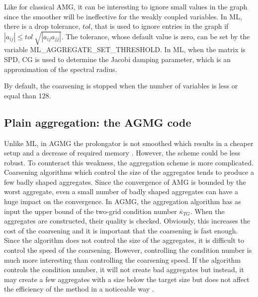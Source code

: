 Like for classical AMG, it can be interesting to ignore small values in
the graph since the smoother will be ineffective for the weakly coupled
variables. In ML, there is a drop tolerance, $tol$, that is used to ignore
entries in the graph if $|a_{ij}| \leq tol\ \sqrt{|a_{ij} a_{jj}|}$. The
tolerance, whose default value is zero, can be set by the variable 
ML\_AGGREGATE\_SET\_THRESHOLD.  In ML, when the matrix is SPD, CG is used 
to determine the Jacobi damping parameter, which is an approximation of 
the spectral radius.

By default, the coarsening is stopped when the number of variables is less 
or equal than 128.

\subsection{Plain aggregation: the AGMG code}
Unlike ML, in AGMG the prolongator is not smoothed which results in a
cheaper setup and a decrease of required memory \cite{agmg2}. However, 
the scheme could be less robust. To counteract this weakness, 
the aggregation scheme is more complicated. Coarsening algorithms which control
the size of the aggregates tends to produce a few badly shaped aggregates.
Since the convergence of AMG is bounded by the worst aggregate, even a small 
number of badly shaped aggregates can have a huge impact on the convergence. 
In AGMG, the aggregation algorithm has as input the upper bound of the 
two-grid condition number $\bar{\kappa}_{TG}$. When the aggregates are constructed,
their quality is checked. Obviously, this increases the cost of the coarsening
and it is important that the coarsening is fast enough. Since the algorithm 
does not control the size of the aggregates, it is difficult to control the 
speed of the coarsening. However, controlling the condition number is much 
more interesting than controlling the coarsening speed. If the algorithm 
controls the condition number, it will not create bad aggregates but instead, it 
may create a few aggregates with a size below the target size but 
does not affect the efficiency of the method in a noticeable way \cite{agmg2}. 

